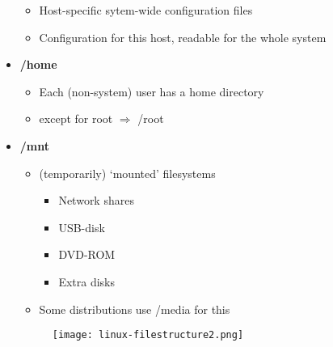 \documentclass{article}
\begin{document}
\begin{itemize}
\begin{itemize}
        \item Host-specific sytem-wide configuration files
        \item Configuration for this host, readable for the whole system
    \end{itemize}
    \item \textbf{/home}
    \begin{itemize}
        \item Each (non-system) user has a home directory
        \item except for root $\Rightarrow$ /root
    \end{itemize}
    \item \textbf{/mnt}
    \begin{itemize}
        \item (temporarily) `mounted' filesystems
        \begin{itemize}
            \item Network shares
            \item USB-disk
            \item DVD-ROM
            \item Extra disks
        \end{itemize}
        \item Some distributions use /media for this
    \end{itemize}
    \begin{figure}[H]
        \centering
        \texttt{[image: linux-filestructure2.png]}
    \end{figure}
    

\end{itemize}
\end{document}
